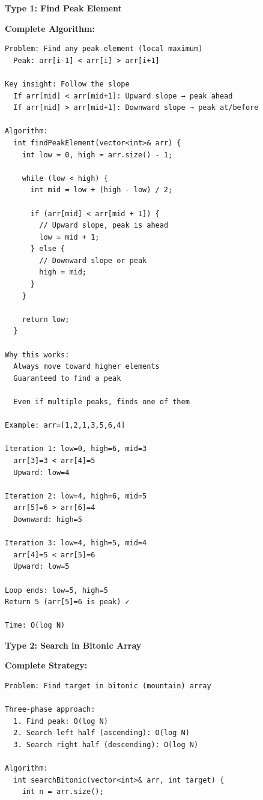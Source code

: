 \documentclass[11pt,a4paper,oneside]{book}
\begin{document}
\begin{tcolorbox}[
    enhanced,breakable,
    colback=lightgray,
    colframe=accentorange,
    boxrule=2pt,
    arc=4mm,
    title=\textbf{Complete Bitonic Array Algorithms}
]
\textbf{Type 1: Find Peak Element}

\textbf{Complete Algorithm:}
\begin{verbatim}
Problem: Find any peak element (local maximum)
  Peak: arr[i-1] < arr[i] > arr[i+1]

Key insight: Follow the slope
  If arr[mid] < arr[mid+1]: Upward slope → peak ahead
  If arr[mid] > arr[mid+1]: Downward slope → peak at/before

Algorithm:
  int findPeakElement(vector<int>& arr) {
    int low = 0, high = arr.size() - 1;
    
    while (low < high) {
      int mid = low + (high - low) / 2;
      
      if (arr[mid] < arr[mid + 1]) {
        // Upward slope, peak is ahead
        low = mid + 1;
      } else {
        // Downward slope or peak
        high = mid;
      }
    }
    
    return low;
  }

Why this works:
  Always move toward higher elements
  Guaranteed to find a peak
  
  Even if multiple peaks, finds one of them

Example: arr=[1,2,1,3,5,6,4]

Iteration 1: low=0, high=6, mid=3
  arr[3]=3 < arr[4]=5
  Upward: low=4

Iteration 2: low=4, high=6, mid=5
  arr[5]=6 > arr[6]=4
  Downward: high=5

Iteration 3: low=4, high=5, mid=4
  arr[4]=5 < arr[5]=6
  Upward: low=5

Loop ends: low=5, high=5
Return 5 (arr[5]=6 is peak) ✓

Time: O(log N)
\end{verbatim}

\textbf{Type 2: Search in Bitonic Array}

\textbf{Complete Strategy:}
\begin{verbatim}
Problem: Find target in bitonic (mountain) array

Three-phase approach:
  1. Find peak: O(log N)
  2. Search left half (ascending): O(log N)
  3. Search right half (descending): O(log N)

Algorithm:
  int searchBitonic(vector<int>& arr, int target) {
    int n = arr.size();
    

\end{verbatim}
\end{tcolorbox}
\end{document}
